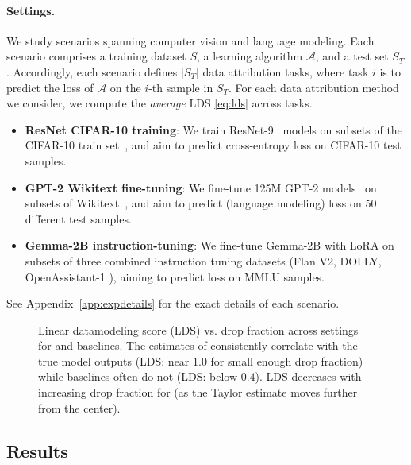 \paragraph{Settings.}
We study scenarios spanning computer vision and
language modeling.
Each scenario comprises a training dataset $S$,
a learning algorithm $\mathcal{A}$,
and a test set $S_T$. Accordingly, each scenario defines $|S_T|$ data
attribution
tasks, where task $i$ is to predict the loss of $\mathcal{A}$ on the
$i$-th sample
in $S_T$. For each data attribution method we consider,
we compute the {\em average} LDS \eqref{eq:lds} across tasks.
\begin{itemize}
  \item {\bf ResNet CIFAR-10 training}: We train ResNet-9~\citep{jordan202494}
    models on subsets of the CIFAR-10 train set~\citep{krizhevsky2009learning},
    and aim to predict cross-entropy loss on CIFAR-10 test samples.
  \item {\bf GPT-2 Wikitext fine-tuning}: We fine-tune 125M
    GPT-2 models~\citep{radford2019language} on subsets of
    Wikitext~\citep{foundation2022english}, and aim to predict
    (language modeling) loss on 50 different test samples.
  \item {\bf Gemma-2B instruction-tuning}: We fine-tune Gemma-2B
    \citep{team2024gemma} with LoRA \citep{hu2021lora} on 
    subsets of three combined instruction tuning datasets
    (Flan V2, DOLLY, OpenAssistant-1
    \citep{longpre2023flan,conover2023free,kopf2024openassistant}), aiming to predict 
    loss on MMLU \citep{hendrycks2021measuring} samples.
\end{itemize}
See Appendix~\ref{app:expdetails} for the exact details of each scenario.


\begin{figure}[bp!]
  \centering
  
  \caption{Linear datamodeling score (LDS) vs. drop fraction across settings for
    \method{} and baselines. The estimates of \method{} consistently correlate
    with the true model outputs (LDS: near $1.0$ for small enough drop fraction)
    while baselines often do not (LDS: below $0.4$). LDS decreases with
    increasing drop fraction for \method{} (as the Taylor estimate moves further
  from the center).}
  \label{fig:cifar_lds}
\end{figure}

\subsection{Results}

